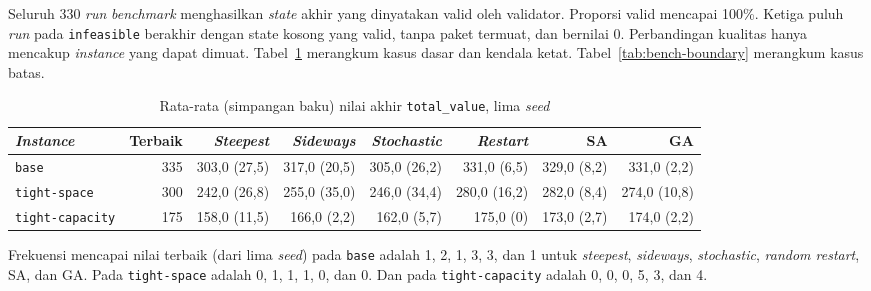 Seluruh 330 \textit{run} \textit{benchmark} menghasilkan \textit{state} akhir yang dinyatakan valid oleh validator. Proporsi valid mencapai 100\%. Ketiga puluh \textit{run} pada \texttt{infeasible} berakhir dengan state kosong yang valid, tanpa paket termuat, dan bernilai 0. Perbandingan kualitas hanya mencakup \textit{instance} yang dapat dimuat. Tabel~\ref{tab:bench-main} merangkum kasus dasar dan kendala ketat. Tabel~\ref{tab:bench-boundary} merangkum kasus batas.

\begin{table}[H]
    \centering
    \small
    \begin{tabular}{@{}lrrrrrrr@{}}
        \toprule
        \textit{Instance}       & Terbaik & \textit{Steepest} & \textit{Sideways} & \textit{Stochastic} & \textit{Restart} & SA          & GA           \\
        \midrule
        \texttt{base}           & 335     & 303,0 (27,5)      & 317,0 (20,5)      & 305,0 (26,2)        & 331,0 (6,5)      & 329,0 (8,2) & 331,0 (2,2)  \\
        \texttt{tight-space}    & 300     & 242,0 (26,8)      & 255,0 (35,0)      & 246,0 (34,4)        & 280,0 (16,2)     & 282,0 (8,4) & 274,0 (10,8) \\
        \texttt{tight-capacity} & 175     & 158,0 (11,5)      & 166,0 (2,2)       & 162,0 (5,7)         & 175,0 (0)        & 173,0 (2,7) & 174,0 (2,2)  \\
        \bottomrule
    \end{tabular}
    \caption{Rata-rata (simpangan baku) nilai akhir \texttt{total\_value}, lima \textit{seed}}
    \label{tab:bench-main}
\end{table}

Frekuensi mencapai nilai terbaik (dari lima \textit{seed}) pada \texttt{base} adalah 1, 2, 1, 3, 3, dan 1 untuk \textit{steepest}, \textit{sideways}, \textit{stochastic}, \textit{random restart}, SA, dan GA. Pada \texttt{tight-space} adalah 0, 1, 1, 1, 0, dan 0. Dan pada \texttt{tight-capacity} adalah 0, 0, 0, 5, 3, dan 4.

